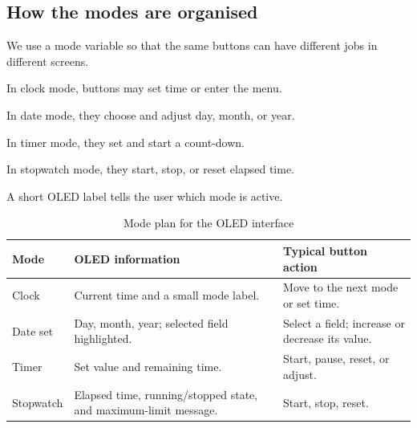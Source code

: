 \documentclass[12pt,letterpaper]{article}
\begin{document}
\subsection{How the modes are organised}

We use a mode variable so that the same buttons
can have different jobs in different screens.

In clock mode,
buttons may set time or enter the menu.

In date mode,
they choose and adjust day,
month, or year.

In timer mode,
they set and start a count-down.

In stopwatch mode,
they start,
stop,
or reset elapsed time.

A short OLED label tells the user
which mode is active.

\begin{table}[H]

  \centering

  \caption{Mode plan for the OLED interface}

  \label{tab:modes}

  \begin{tabularx}{
    \textwidth
  }{
    @{}p{30mm}Y Y@{}
  }

    \toprule

    \textbf{Mode}
    &
    \textbf{OLED information}
    &
    \textbf{Typical button action}
    \\

    \midrule

    Clock
    &
    Current time and a small mode label.
    &
    Move to the next mode or set time.
    \\

    Date set
    &
    Day, month, year;
    selected field highlighted.
    &
    Select a field;
    increase or decrease its value.
    \\

    Timer
    &
    Set value and remaining time.
    &
    Start, pause, reset, or adjust.
    \\

    Stopwatch
    &
    Elapsed time, running/stopped state, and maximum-limit message.
    &
    Start, stop, reset.
    \\

    \bottomrule

  \end{tabularx}

\end{table}
\end{document}
